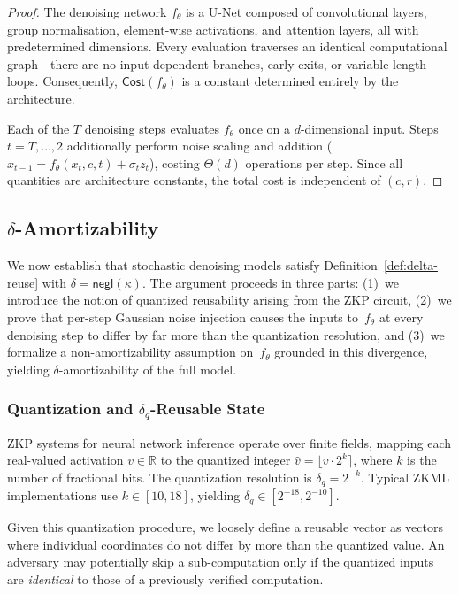\begin{proof}
The denoising network $f_\theta$ is a U-Net composed of convolutional layers, group normalisation, element-wise activations, and attention layers, all with predetermined dimensions. Every evaluation traverses an identical computational graph---there are no input-dependent branches, early exits, or variable-length loops. Consequently, $\mathsf{Cost}(f_\theta)$ is a constant determined entirely by the architecture.

Each of the $T$ denoising steps evaluates $f_\theta$ once on a $d$-dimensional input. Steps $t = T, \ldots, 2$ additionally perform noise scaling and addition ($x_{t-1} = f_\theta(x_t, c, t) + \sigma_t z_t$), costing $\Theta(d)$ operations per step. Since all quantities are architecture constants, the total cost is independent of $(c, r)$.
\end{proof}

\subsection{$\delta$-Amortizability}
\label{app:amortizability}

We now establish that stochastic denoising models satisfy Definition~\ref{def:delta-reuse} with $\delta = \mathsf{negl}(\kappa)$. The argument proceeds in three parts: (1)~we introduce the notion of quantized reusability arising from the ZKP circuit, (2)~we prove that per-step Gaussian noise injection causes the inputs to~$f_\theta$ at every denoising step to differ by far more than the quantization resolution, and (3)~we formalize a non-amortizability assumption on~$f_\theta$ grounded in this divergence, yielding $\delta$-amortizability of the full model.

\subsubsection{Quantization and $\delta_q$-Reusable State}

ZKP systems for neural network inference operate over finite fields, mapping each real-valued activation $v \in \mathbb{R}$ to the quantized integer $\hat{v} = \lfloor v \cdot 2^k \rceil$, where $k$ is the number of fractional bits. The quantization resolution is $\delta_q = 2^{-k}$. Typical ZKML implementations use $k \in [10, 18]$, yielding $\delta_q \in [2^{-18}, 2^{-10}]$.

Given this quantization procedure, we loosely define a reusable vector as vectors where individual coordinates do not differ by more than the quantized value. An adversary may potentially skip a sub-computation only if the quantized inputs are \emph{identical} to those of a previously verified computation. 

